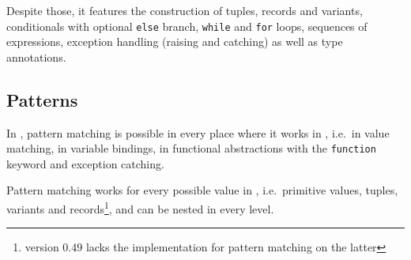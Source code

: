 Despite those, it features the construction of tuples, records and variants,
conditionals with optional \texttt{else} branch, \texttt{while} and
\texttt{for} loops, sequences of expressions, exception handling (raising and
catching) as well as type annotations.

\subsection*{Patterns}

In \easyocaml, pattern matching is possible in every place where it works in
\ocaml, i.e.\ in value matching, in variable bindings, in
functional abstractions with the \texttt{function} keyword and exception catching.

Pattern matching works for every possible value in \easyocaml, i.e.\ primitive
values, tuples, variants and records\footnote{version 0.49 lacks the
implementation for pattern matching on the latter}, and can be nested in every
level.

